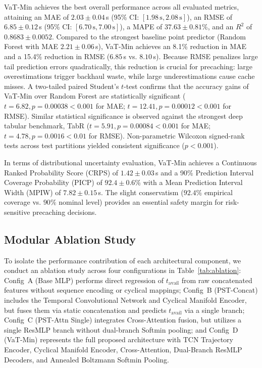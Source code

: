 \documentclass[journal]{IEEEtran}
\begin{document}
VaT-Min achieves the best overall performance across all evaluated metrics, attaining an MAE of $2.03 \pm 0.04$\,s (95\% CI: $[1.98\,\text{s}, 2.08\,\text{s}]$), an RMSE of $6.85 \pm 0.12$\,s (95\% CI: $[6.70\,\text{s}, 7.00\,\text{s}]$), a MAPE of $37.63 \pm 0.81$\%, and an $R^2$ of $0.8683 \pm 0.0052$. Compared to the strongest baseline point predictor (Random Forest with MAE $2.21 \pm 0.06$\,s), VaT-Min achieves an 8.1\% reduction in MAE and a 15.4\% reduction in RMSE ($6.85$\,s vs. $8.10$\,s). Because RMSE penalizes large tail prediction errors quadratically, this reduction is crucial for precaching: large overestimations trigger backhaul waste, while large underestimations cause cache misses. A two-tailed paired Student's $t$-test confirms that the accuracy gains of VaT-Min over Random Forest are statistically significant ($t = 6.82, p = 0.00038 < 0.001$ for MAE; $t = 12.41, p = 0.00012 < 0.001$ for RMSE). Similar statistical significance is observed against the strongest deep tabular benchmark, TabR ($t = 5.91, p = 0.00084 < 0.001$ for MAE; $t = 4.78, p = 0.0016 < 0.01$ for RMSE). Non-parametric Wilcoxon signed-rank tests across test partitions yielded consistent significance ($p < 0.001$).

In terms of distributional uncertainty evaluation, VaT-Min achieves a Continuous Ranked Probability Score (CRPS) of $1.42 \pm 0.03$\,s and a 90\% Prediction Interval Coverage Probability (PICP) of $92.4 \pm 0.6$\% with a Mean Prediction Interval Width (MPIW) of $7.82 \pm 0.15$\,s. The slight conservatism ($92.4\%$ empirical coverage vs. $90\%$ nominal level) provides an essential safety margin for risk-sensitive precaching decisions.

\subsection{Modular Ablation Study}\label{sec:ablation}
To isolate the performance contribution of each architectural component, we conduct an ablation study across four configurations in Table~\ref{tab:ablation}: Config~A (Base MLP) performs direct regression of $t_{\text{avail}}$ from raw concatenated features without sequence encoding or cyclical mappings; Config~B (PST-Concat) includes the Temporal Convolutional Network and Cyclical Manifold Encoder, but fuses them via static concatenation and predicts $t_{\text{avail}}$ via a single branch; Config~C (PST-Attn Single) integrates Cross-Attention fusion, but utilizes a single ResMLP branch without dual-branch Softmin pooling; and Config~D (VaT-Min) represents the full proposed architecture with TCN Trajectory Encoder, Cyclical Manifold Encoder, Cross-Attention, Dual-Branch ResMLP Decoders, and Annealed Boltzmann Softmin Pooling.
\end{document}
